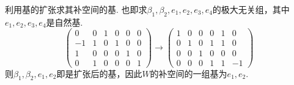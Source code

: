 \documentclass[UTF8,12pt,a4paper,fontset=fandol]{ctexart}
\begin{document}
\begin{solve}
\begin{enumerate}
\begin{enumerate}
                                利用基的扩张求其补空间的基. 也即求$\beta_1,\beta_2,e_1,e_2,e_3,e_4$的极大无关组，其中$e_1,e_2,e_3,e_4$是自然基.
                                \[\begin{pmatrix}
                                        0  & 0 & 1 & 0 & 0 & 0 \\
                                        -1 & 1 & 0 & 1 & 0 & 0 \\
                                        1  & 0 & 0 & 0 & 1 & 0 \\
                                        0  & 1 & 0 & 0 & 0 & 1
                                    \end{pmatrix}\rightarrow
                                    \begin{pmatrix}1 & 0 & 0 & 0 & 1 & 0  \\
                 0 & 1 & 0 & 1 & 1 & 0  \\
                 0 & 0 & 1 & 0 & 0 & 0  \\
                 0 & 0 & 0 & 1 & 1 & -1
                                    \end{pmatrix}\]
                                则$\beta_1,\beta_2,e_1,e_2$即是扩张后的基，因此$W$的补空间的一组基为$e_1,e_2$.
                      \end{enumerate}
            \end{enumerate}
\end{solve}
\end{document}
